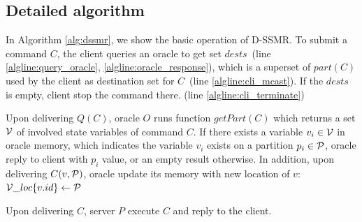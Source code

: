\subsection{Detailed algorithm}
\label{sec:detailalg}

In Algorithm \ref{alg:dssmr}, we show the basic operation of D-SSMR. 
To submit a command $C$, the client queries an oracle to get set $dests$~(line \ref{algline:query_oracle}, \ref{algline:oracle_response}), which is a superset of $part(C)$ used by the client as destination set for $C$~(line \ref{algline:cli_mcast}). If the $dests$ is empty, client stop the command there. (line \ref{algline:cli_terminate})

Upon delivering $Q(C)$, oracle $O$ runs function $getPart(C)$ which returns a set $\mathcal{V}$ of involved state variables of command $C$. If there exists a variable $v_i \in \mathcal{V}$ in oracle memory, which indicates the variable $v_i$ exists on a partition $p_i \in \mathcal{P}$, oracle reply to client with $p_i$ value, or an empty result otherwise. In addition, upon delivering $C(v, \mathcal{P})$, oracle update its memory with new location of $v$: $\mathcal{V}\_loc\{v.id\} \leftarrow \mathcal{P}$

Upon delivering $C$, server $P$ execute $C$ and reply to the client. 


